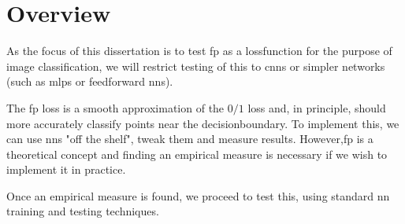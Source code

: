 \section{Overview}

As the focus of this dissertation is to test \gls{fp} as a \gls{lossfunction} for the purpose of image classification, we will restrict testing of this to \gls{cnn}s or simpler networks (such as  \gls{mlp}s or \gls{feedforward} \gls{nn}s). 
\bigskip

 The \gls{fp} loss is a smooth approximation of the $0/1$ loss and, in principle, should more accurately classify points near the \gls{decisionboundary}. To implement this, we can use  \gls{nn}s "off the shelf", tweak them and measure results. However,\gls{fp} is a theoretical concept and finding an empirical measure is necessary if we wish to implement it in practice. 
 \bigskip

Once an empirical measure is found, we proceed to test this, using standard \gls{nn} training and testing techniques.
\bigskip

